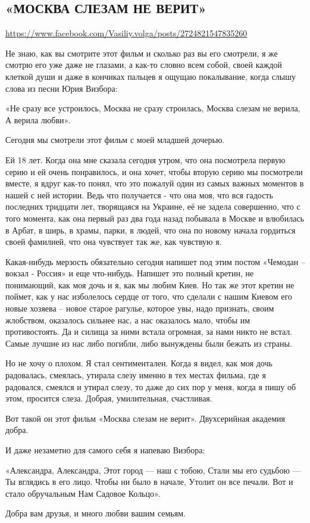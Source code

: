  
 

\subsection{«МОСКВА СЛЕЗАМ НЕ ВЕРИТ»}

\url{https://www.facebook.com/Vasiliy.volga/posts/2724821547835260}

Не знаю, как вы смотрите этот фильм и сколько раз вы его смотрели, я же смотрю
его уже даже не глазами, а как-то словно всем собой, своей каждой клеткой души
и даже в кончиках пальцев я ощущаю покалывание, когда слышу слова из песни Юрия
Визбора:

«Не сразу все устроилось,
Москва не сразу строилась,
Москва слезам не верила,
А верила любви».

Сегодня мы смотрели этот фильм с моей младшей дочерью.

Ей 18 лет. Когда она мне сказала сегодня утром, что она посмотрела первую серию
и ей очень понравилось, и она хочет, чтобы вторую серию мы посмотрели вместе, я
вдруг как-то понял, что это пожалуй один из самых важных моментов в нашей с ней
истории. Ведь что получается - что она моя, что вся гадость последних тридцати
лет, творящаяся на Украине, её не задела совершенно, что с того момента, как
она первый раз два года назад побывала в Москве и влюбилась в Арбат, в ширь, в
храмы, парки, в людей, что она по новому начала гордиться своей фамилией, что
она чувствует так же, как чувствую я.

Какая-нибудь мерзость обязательно сегодня напишет под этим постом «Чемодан –
вокзал - Россия» и еще что-нибудь. Напишет это полный кретин, не понимающий,
как моя дочь и я, как мы любим Киев. Но так же этот кретин не поймет, как у нас
изболелось сердце от того, что сделали с нашим Киевом его новые хозяева – новое
старое рагулье, которое увы, надо признать, своим жлобством, оказалось сильнее
нас, а нас оказалось мало, чтобы им противостоять. Да и силища за ними встала
огромная, за нами никто не встал. Самые лучшие из нас либо погибли, либо
вынуждены были бежать из страны.

Но не хочу о плохом. Я стал сентиментален. Когда я видел, как моя дочь
радовалась, смеялась, утирала слезу именно в тех местах фильма, где я
радовался, смеялся и утирал слезу, то даже до сих пор у меня, когда я пишу об
этом, просится слеза. Добрая, умилительная, счастливая.

Вот такой он этот фильм «Москва слезам не верит». Двухсерийная академия добра.

И даже незаметно для самого себя я напеваю Визбора:

«Александра, Александра,
Этот город — наш с тобою,
Стали мы его судьбою —
Ты вглядись в его лицо.
Чтобы ни было в начале,
Утолит он все печали.
Вот и стало обручальным
Нам Садовое Кольцо».

Добра вам друзья, и много любви вашим семьям.
